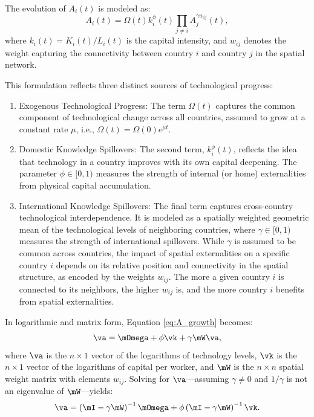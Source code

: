 \documentclass[english,12pt]{book}\usepackage[]{graphicx}\usepackage[]{xcolor}
\begin{document}
The evolution of $A_i(t)$ is modeled as:
\begin{equation}\label{eq:A_growth}
A_i(t) = \Omega(t)k_i^{\phi}(t)\prod_{j\neq i}A_j^{\gamma w_{ij}}(t),
\end{equation}
%
where $k_i(t) = K_i(t)/L_i(t)$ is the capital intensity, and $w_{ij}$ denotes the weight capturing the connectivity between country $i$ and country $j$ in the spatial network.

This formulation reflects three distinct sources of technological progress:
\begin{enumerate}
\item Exogenous Technological Progress: The term $\Omega(t)$ captures the common component of technological change across all countries, assumed to grow at a constant rate $\mu$, i.e., $\Omega(t) = \Omega(0)e^{\mu t}$.
\item Domestic Knowledge Spillovers: The second term, $k_i^{\phi}(t)$, reflects the idea that technology in a country improves with its own capital deepening. The parameter $\phi \in [0,1)$ measures the strength of internal (or home) externalities from physical capital accumulation.
\item International Knowledge Spillovers: The final term captures cross-country technological interdependence. It is modeled as a spatially weighted geometric mean of the technological levels of neighboring countries, where $\gamma \in [0,1)$ measures the strength of international spillovers. While $\gamma$ is assumed to be common across countries, the impact of spatial externalities on a specific country $i$ depends on its relative position and connectivity in the spatial structure, as encoded by the weights $w_{ij}$. The more a given country $i$ is connected to its neighbors, the higher $w_{ij}$ is, and the more country $i$ benefits from spatial externalities. 
\end{enumerate}

In logarithmic and  matrix form, Equation \eqref{eq:A_growth} becomes:
\begin{equation*}
\va = \mOmega + \phi\vk + \gamma \mW\va, 
\end{equation*}
%
where $\va$ is the $n \times 1$ vector of the logarithms of technology levels, $\vk$ is the $n \times 1$ vector of the logarithms of capital per worker, and $\mW$ is the $n \times n$ spatial weight matrix with elements $w_{ij}$. Solving for $\va$---assuming $\gamma \neq 0$ and $1/\gamma$ is not an eigenvalue of $\mW$---yields:
\begin{equation*}
\va = \left(\mI-\gamma \mW\right)^{-1}\mOmega + \phi\left(\mI-\gamma \mW\right)^{-1}\vk.
\end{equation*}
\end{document}
